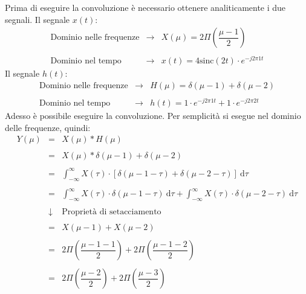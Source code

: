 \documentclass[a4paper]{article}
\begin{document}
	Prima di eseguire la convoluzione è necessario ottenere analiticamente i due segnali. Il segnale $x\left(t\right)$:
	\begin{equation*}
		\begin{array}{lll}
			\text{Dominio nelle frequenze} & \longrightarrow & X\left(\mu\right) = 2 \Pi\left(\dfrac{\mu - 1}{2}\right) \\
			\\
			\text{Dominio nel tempo} & \longrightarrow & x\left(t\right) = 4 \mathrm{sinc}\left(2t\right) \cdot e^{-j 2 \pi 1 t}
		\end{array}
	\end{equation*}
	Il segnale $h\left(t\right)$:
	\begin{equation*}
		\begin{array}{lll}
			\text{Dominio nelle frequenze} & \longrightarrow & H\left(\mu\right) = \delta\left(\mu-1\right) + \delta\left(\mu-2\right) \\
			\\
			\text{Dominio nel tempo} & \longrightarrow & h\left(t\right) = 1 \cdot e^{-j 2 \pi 1 t} + 1 \cdot e^{-j 2 \pi 2 t}
		\end{array}
	\end{equation*}
	Adesso è possibile eseguire la convoluzione. Per semplicità si esegue nel dominio delle frequenze, quindi:
	\begin{equation*}
		\begin{array}{lll}
			Y\left(\mu\right) & = & X\left(\mu\right) * H\left(\mu\right) \\
			\\
			& = & X\left(\mu\right) * \delta\left(\mu-1\right) + \delta\left(\mu-2\right) \\
			\\
			& = & \displaystyle\int_{-\infty}^{\infty} X\left(\tau\right) \cdot \left[\delta\left(\mu-1-\tau\right) + \delta\left(\mu-2-\tau\right)\right] \:\mathrm{d}\tau \\
			\\
			& = & \displaystyle\int_{-\infty}^{\infty} X\left(\tau\right) \cdot \delta\left(\mu - 1 -\tau\right) \:\mathrm{d}\tau + \displaystyle\int_{-\infty}^{\infty} X\left(\tau\right) \cdot \delta\left(\mu - 2 -\tau\right) \:\mathrm{d}\tau \\
			\\
			& \downarrow & \text{Proprietà di setacciamento} \\
			\\
			& = & X\left(\mu - 1\right) + X\left(\mu - 2\right) \\
			\\
			& = & 2\Pi\left(\dfrac{\mu - 1 - 1 }{2}\right) + 2\Pi\left(\dfrac{\mu - 1 - 2}{2}\right) \\
			\\
			& = & 2\Pi\left(\dfrac{\mu - 2}{2}\right) + 2\Pi\left(\dfrac{\mu - 3}{2}\right)
		\end{array}
	\end{equation*}\newpage
	
\end{document}
